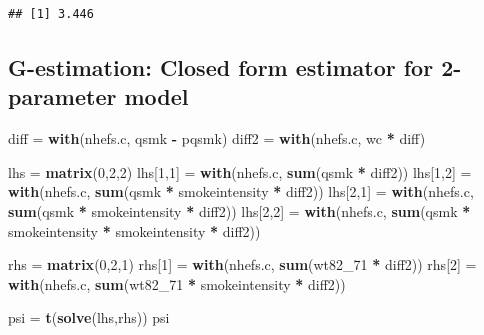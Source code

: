 \documentclass[
  10pt,
]{book}
\newenvironment{Shaded}{\begin{snugshade}}{\end{snugshade}}
\newcommand{\DecValTok}[1]{\textcolor[rgb]{0.00,0.00,0.81}{#1}}
\newcommand{\KeywordTok}[1]{\textcolor[rgb]{0.13,0.29,0.53}{\textbf{#1}}}
\newcommand{\NormalTok}[1]{#1}
\newcommand{\OperatorTok}[1]{\textcolor[rgb]{0.81,0.36,0.00}{\textbf{#1}}}
\newcommand{\StringTok}[1]{\textcolor[rgb]{0.31,0.60,0.02}{#1}}
\begin{document}
\begin{verbatim}
## [1] 3.446
\end{verbatim}

\hypertarget{g-estimation-closed-form-estimator-for-2-parameter-model}{%
\subsection{G-estimation: Closed form estimator for 2-parameter model}\label{g-estimation-closed-form-estimator-for-2-parameter-model}}

\begin{Shaded}
\begin{Highlighting}[]
\NormalTok{diff =}\StringTok{ }\KeywordTok{with}\NormalTok{(nhefs.c, qsmk }\OperatorTok{-}\StringTok{ }\NormalTok{pqsmk)}
\NormalTok{diff2 =}\StringTok{ }\KeywordTok{with}\NormalTok{(nhefs.c, wc }\OperatorTok{*}\StringTok{ }\NormalTok{diff)}

\NormalTok{lhs =}\StringTok{ }\KeywordTok{matrix}\NormalTok{(}\DecValTok{0}\NormalTok{,}\DecValTok{2}\NormalTok{,}\DecValTok{2}\NormalTok{)}
\NormalTok{lhs[}\DecValTok{1}\NormalTok{,}\DecValTok{1}\NormalTok{] =}\StringTok{ }\KeywordTok{with}\NormalTok{(nhefs.c, }\KeywordTok{sum}\NormalTok{(qsmk }\OperatorTok{*}\StringTok{ }\NormalTok{diff2))}
\NormalTok{lhs[}\DecValTok{1}\NormalTok{,}\DecValTok{2}\NormalTok{] =}\StringTok{ }\KeywordTok{with}\NormalTok{(nhefs.c, }\KeywordTok{sum}\NormalTok{(qsmk }\OperatorTok{*}\StringTok{ }\NormalTok{smokeintensity  }\OperatorTok{*}\StringTok{ }\NormalTok{diff2))}
\NormalTok{lhs[}\DecValTok{2}\NormalTok{,}\DecValTok{1}\NormalTok{] =}\StringTok{ }\KeywordTok{with}\NormalTok{(nhefs.c, }\KeywordTok{sum}\NormalTok{(qsmk }\OperatorTok{*}\StringTok{ }\NormalTok{smokeintensity }\OperatorTok{*}\StringTok{ }\NormalTok{diff2))}
\NormalTok{lhs[}\DecValTok{2}\NormalTok{,}\DecValTok{2}\NormalTok{] =}\StringTok{ }\KeywordTok{with}\NormalTok{(nhefs.c, }\KeywordTok{sum}\NormalTok{(qsmk }\OperatorTok{*}\StringTok{ }\NormalTok{smokeintensity }\OperatorTok{*}\StringTok{ }\NormalTok{smokeintensity }\OperatorTok{*}\StringTok{ }\NormalTok{diff2))}

\NormalTok{rhs =}\StringTok{ }\KeywordTok{matrix}\NormalTok{(}\DecValTok{0}\NormalTok{,}\DecValTok{2}\NormalTok{,}\DecValTok{1}\NormalTok{)}
\NormalTok{rhs[}\DecValTok{1}\NormalTok{] =}\StringTok{ }\KeywordTok{with}\NormalTok{(nhefs.c, }\KeywordTok{sum}\NormalTok{(wt82_}\DecValTok{71} \OperatorTok{*}\StringTok{ }\NormalTok{diff2))}
\NormalTok{rhs[}\DecValTok{2}\NormalTok{] =}\StringTok{ }\KeywordTok{with}\NormalTok{(nhefs.c, }\KeywordTok{sum}\NormalTok{(wt82_}\DecValTok{71} \OperatorTok{*}\StringTok{ }\NormalTok{smokeintensity }\OperatorTok{*}\StringTok{ }\NormalTok{diff2))}

\NormalTok{psi =}\StringTok{ }\KeywordTok{t}\NormalTok{(}\KeywordTok{solve}\NormalTok{(lhs,rhs))}
\NormalTok{psi}
\end{Highlighting}
\end{Shaded}
\end{document}
